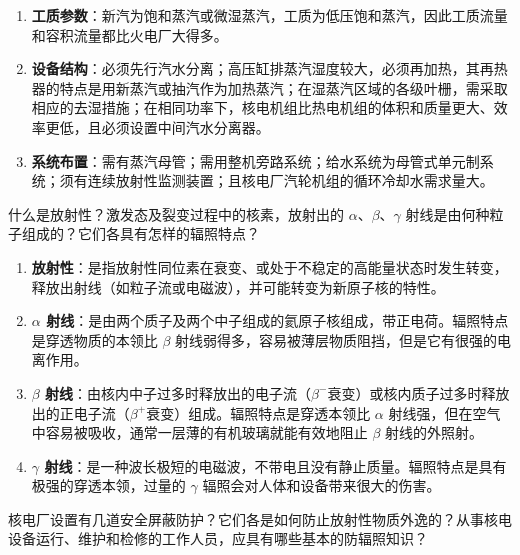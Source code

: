 \begin{solution}
\begin{enumerate}
  \item \textbf{工质参数}：新汽为饱和蒸汽或微湿蒸汽，工质为低压饱和蒸汽，因此工质流量和容积流量都比火电厂大得多。
  \item \textbf{设备结构}：必须先行汽水分离；高压缸排蒸汽湿度较大，必须再加热，其再热器的特点是用新蒸汽或抽汽作为加热蒸汽；在湿蒸汽区域的各级叶栅，需采取相应的去湿措施；在相同功率下，核电机组比热电机组的体积和质量更大、效率更低，且必须设置中间汽水分离器。
  \item \textbf{系统布置}：需有蒸汽母管；需用整机旁路系统；给水系统为母管式单元制系统；须有连续放射性监测装置；且核电厂汽轮机组的循环冷却水需求量大。
\end{enumerate}
\end{solution}

\begin{problem}
什么是放射性？激发态及裂变过程中的核素，放射出的 \(\alpha\)、\(\beta\)、\(\gamma\) 射线是由何种粒子组成的？它们各具有怎样的辐照特点？
\end{problem}

\begin{solution}
\begin{enumerate}
  \item \textbf{放射性}：是指放射性同位素在衰变、或处于不稳定的高能量状态时发生转变，释放出射线（如粒子流或电磁波），并可能转变为新原子核的特性。
  \item \textbf{\(\alpha\) 射线}：是由两个质子及两个中子组成的氦原子核组成，带正电荷。辐照特点是穿透物质的本领比 \(\beta\) 射线弱得多，容易被薄层物质阻挡，但是它有很强的电离作用。
  \item \textbf{\(\beta\) 射线}：由核内中子过多时释放出的电子流（\(\beta^-\)衰变）或核内质子过多时释放出的正电子流（\(\beta^+\)衰变）组成。辐照特点是穿透本领比 \(\alpha\) 射线强，但在空气中容易被吸收，通常一层薄的有机玻璃就能有效地阻止 \(\beta\) 射线的外照射。
  \item \textbf{\(\gamma\) 射线}：是一种波长极短的电磁波，不带电且没有静止质量。辐照特点是具有极强的穿透本领，过量的 \(\gamma\) 辐照会对人体和设备带来很大的伤害。
\end{enumerate}
\end{solution}

\begin{problem}
核电厂设置有几道安全屏蔽防护？它们各是如何防止放射性物质外逸的？从事核电设备运行、维护和检修的工作人员，应具有哪些基本的防辐照知识？
\end{problem}

